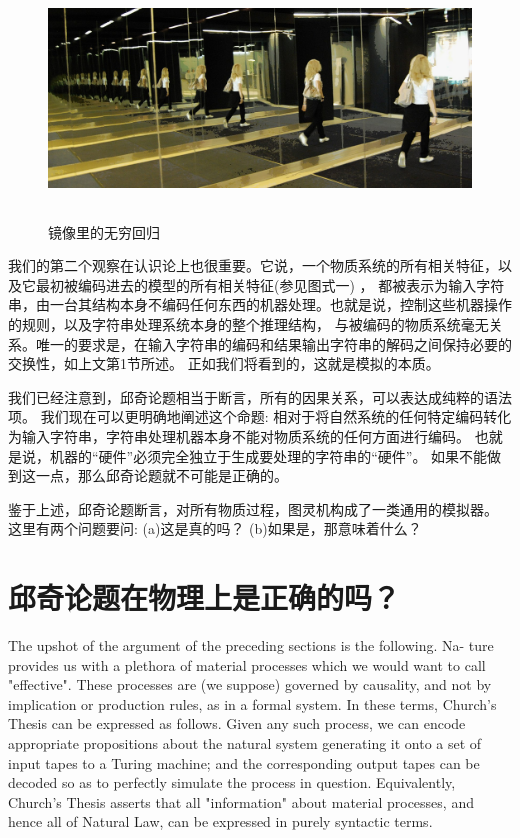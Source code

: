 \documentclass[a4paper,12pt]{article}
\begin{document}
\begin{figure}[ht]
\centering
\includegraphics[height=2.5in]{images/infinite_reflections.jpg}
\caption{镜像里的无穷回归}
\end{figure}

我们的第二个观察在认识论上也很重要。它说，一个物质系统的所有相关特征，以及它最初被编码进去的模型的所有相关特征(参见图式一) ，
都被表示为输入字符串，由一台其结构本身不编码任何东西的机器处理。也就是说，控制这些机器操作的规则，以及字符串处理系统本身的整个推理结构，
与被编码的物质系统毫无关系。唯一的要求是，在输入字符串的编码和结果输出字符串的解码之间保持必要的交换性，如上文第1节所述。
正如我们将看到的，这就是模拟的本质。

我们已经注意到，邱奇论题相当于断言，所有的因果关系，可以表达成纯粹的语法项。
我们现在可以更明确地阐述这个命题: 相对于将自然系统的任何特定编码转化为输入字符串，字符串处理机器本身不能对物质系统的任何方面进行编码。
也就是说，机器的“硬件”必须完全独立于生成要处理的字符串的“硬件”。 如果不能做到这一点，那么邱奇论题就不可能是正确的。

鉴于上述，邱奇论题断言，对所有物质过程，图灵机构成了一类通用的模拟器。 这里有两个问题要问: (a)这是真的吗？ (b)如果是，那意味着什么？

\section{邱奇论题在物理上是正确的吗？}

The upshot of the argument of the preceding sections is the following. Na-
ture provides us with a plethora of material processes which we would want
to call "effective". These processes are (we suppose) governed by causality,
and not by implication or production rules, as in a formal system. In these
terms, Church's Thesis can be expressed as follows. Given any such process,
we can encode appropriate propositions about the natural system generating
it onto a set of input tapes to a Turing machine; and the corresponding output
tapes can be decoded so as to perfectly simulate the process in question.
Equivalently, Church's Thesis asserts that all "information" about material
processes, and hence all of Natural Law, can be expressed in purely syntactic
terms.
\end{document}
